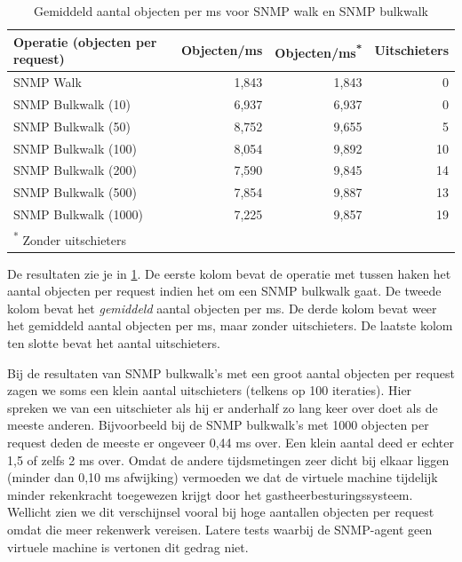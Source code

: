 \begin{table}[h]
\centering
\begin{tabular}{@{}lrrr@{}}
\toprule
Operatie (objecten per request) & Objecten/ms & Objecten/ms\textsuperscript{*} & Uitschieters \\ \midrule
SNMP Walk                       & 1,843       & 1,843           & 0            \\
SNMP Bulkwalk (10)              & 6,937       & 6,937           & 0            \\
SNMP Bulkwalk (50)              & 8,752       & 9,655           & 5            \\
SNMP Bulkwalk (100)             & 8,054       & 9,892           & 10           \\
SNMP Bulkwalk (200)             & 7,590       & 9,845           & 14           \\
SNMP Bulkwalk (500)             & 7,854       & 9,887           & 13           \\
SNMP Bulkwalk (1000)            & 7,225       & 9,857           & 19           \\ \midrule[.5pt]
\multicolumn{4}{l}{\textsuperscript{*} \footnotesize{Zonder uitschieters}}
\end{tabular}
\caption{Gemiddeld aantal objecten per ms voor SNMP walk en SNMP bulkwalk}
\label{tabel-bulkrequests}
\end{table}

De resultaten zie je in \cref{tabel-bulkrequests}.
De eerste kolom bevat de operatie met tussen haken het aantal objecten per request indien het om een SNMP bulkwalk gaat.
De tweede kolom bevat het \emph{gemiddeld} aantal objecten per ms.
De derde kolom bevat weer het gemiddeld aantal objecten per ms, maar zonder uitschieters.
De laatste kolom ten slotte bevat het aantal uitschieters.

Bij de resultaten van SNMP bulkwalk's met een groot aantal objecten per request zagen we soms een klein aantal uitschieters (telkens op 100 iteraties).
Hier spreken we van een uitschieter als hij er anderhalf zo lang keer over doet als de meeste anderen.
Bijvoorbeeld bij de SNMP bulkwalk's met 1000 objecten per request deden de meeste er ongeveer 0,44 ms over.
Een klein aantal deed er echter 1,5 of zelfs 2 ms over.
Omdat de andere tijdsmetingen zeer dicht bij elkaar liggen (minder dan 0,10 ms afwijking) vermoeden we
dat de virtuele machine tijdelijk minder rekenkracht toegewezen krijgt door het gastheerbesturingssysteem.
Wellicht zien we dit verschijnsel vooral bij hoge aantallen objecten per request omdat die meer rekenwerk vereisen.
Latere tests waarbij de SNMP-agent geen virtuele machine is vertonen dit gedrag niet.

